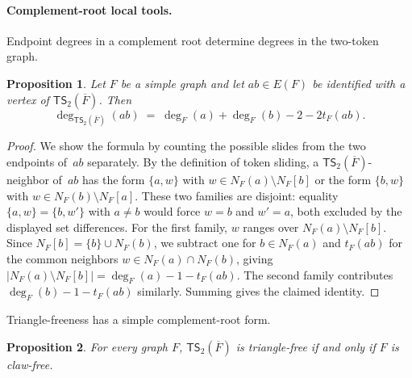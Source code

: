 \documentclass[a4paper]{article}
\theoremstyle{plain}
\newtheorem{proposition}[proposition]{Proposition}
\theoremstyle{definition}
\newcommand{\TSsym}{\mathsf{TS}}
\numberwithin{equation}{section}
\begin{document}
\paragraph{Complement-root local tools.}

Endpoint degrees in a complement root determine degrees in the two-token graph.

\begin{proposition}
\label{prop:per-edge-degree}
Let $F$ be a simple graph and let $ab\in E(F)$ be identified with a vertex of $\TSsym_2(\overline{F})$.
Then
\[
 \deg_{\TSsym_2(\overline{F})}(ab)\;=\;\deg_F(a)+\deg_F(b)-2-2t_F(ab).
\]
\end{proposition}

\begin{proof}
We show the formula by counting the possible slides from the two endpoints of~$ab$ separately.
By the definition of token sliding, a $\TSsym_2(\overline{F})$-neighbor of~$ab$ has the form $\{a,w\}$ with $w\in N_F(a)\setminus N_F[b]$ or the form $\{b,w\}$ with $w\in N_F(b)\setminus N_F[a]$.
These two families are disjoint: equality $\{a,w\}=\{b,w'\}$ with $a\ne b$ would force $w=b$ and $w'=a$, both excluded by the displayed set differences.
For the first family, $w$ ranges over $N_F(a)\setminus N_F[b]$.
Since $N_F[b]=\{b\}\cup N_F(b)$, we subtract one for $b\in N_F(a)$ and $t_F(ab)$ for the common neighbors $w\in N_F(a)\cap N_F(b)$, giving $|N_F(a)\setminus N_F[b]|=\deg_F(a)-1-t_F(ab)$.
The second family contributes $\deg_F(b)-1-t_F(ab)$ similarly.
Summing gives the claimed identity.
\end{proof}

Triangle-freeness has a simple complement-root form.

\begin{proposition}
\label{prop:claw-iff-triangle-free}
For every graph $F$, $\TSsym_2(\overline{F})$ is triangle-free if and only if $F$ is claw-free.
\end{proposition}
\end{document}
